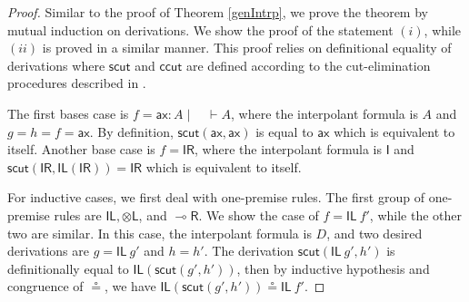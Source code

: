 \documentclass[sn-mathphys-num]{sn-jnl}%
\newcommand{\vd}{\vdash}
\newcommand{\tl}{\otimes \mathsf{L}}
\newcommand{\unitl}{\mathsf{IL}}
\newcommand{\unitr}{\mathsf{IR}}
\newcommand{\ax}{\mathsf{ax}}
\newcommand{\lolli}{\multimap}
\newcommand{\lright}{{\lolli}\mathsf{R}}
\newcommand{\unit}{\mathsf{I}}
\newcommand{\mf}[1]{\mathsf{#1}}
\theoremstyle{thmstyleone}%
\theoremstyle{thmstyletwo}%
\theoremstyle{thmstylethree}%
\begin{document}
\begin{proof}
Similar to the proof of Theorem \ref{genIntrp}, we prove the theorem by mutual induction on derivations.
We show the proof of the statement $(i)$, while $(ii)$ is proved in a similar manner.
This proof relies on definitional equality of derivations where $\mf{scut}$ and $\mf{ccut}$ are defined according to the cut-elimination procedures described in \cite{uustalu:sequent:2021,wan2024}.

The first bases case is $f = \ax : A \mid \quad \vd A$, where the interpolant formula is $A$ and $g = h = f = \ax$. 
By definition, $\mf{scut} (\ax , \ax)$ is equal to $\ax$ which is equivalent to itself.
Another base case is $f = \unitr$, where the interpolant formula is $\unit$ and $\mf{scut} (\unitr , \unitl (\unitr)) = \unitr$ which is equivalent to itself.

For inductive cases, we first deal with one-premise rules.
The first group of one-premise rules are $\unitl, \tl$, and $\lright$.
We show the case of $f = \unitl \ f'$, while the other two are similar.
In this case, the interpolant formula is $D$, and two desired derivations are $g = \unitl \ g'$ and $h = h'$.
The derivation $\mf{scut} (\unitl \ g', h')$ is definitionally equal to $\unitl (\mf{scut} (g' , h'))$, then by inductive hypothesis and congruence of $\circeq$, we have $\unitl (\mf{scut} (g' , h')) \circeq \unitl \ f'$.


\end{proof}
\end{document}
